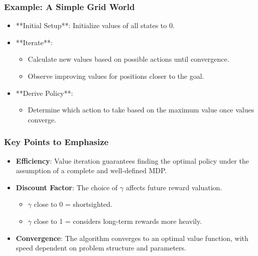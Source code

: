 \documentclass[aspectratio=169]{beamer}
\begin{document}
\begin{frame}[fragile]
    \frametitle{Example: A Simple Grid World}
    \begin{itemize}
        \item **Initial Setup**: Initialize values of all states to 0.
        
        \item **Iterate**: 
            \begin{itemize}
                \item Calculate new values based on possible actions until convergence. 
                \item Observe improving values for positions closer to the goal.
            \end{itemize}
        
        \item **Derive Policy**: 
            \begin{itemize}
                \item Determine which action to take based on the maximum value once values converge.
            \end{itemize}
    \end{itemize}
\end{frame}

\begin{frame}[fragile]
    \frametitle{Key Points to Emphasize}
    \begin{itemize}
        \item \textbf{Efficiency}: Value iteration guarantees finding the optimal policy under the assumption of a complete and well-defined MDP.
        
        \item \textbf{Discount Factor}: The choice of \( \gamma \) affects future reward valuation. 
            \begin{itemize}
                \item \( \gamma \) close to 0 = shortsighted.
                \item \( \gamma \) close to 1 = considers long-term rewards more heavily.
            \end{itemize}
        
        \item \textbf{Convergence}: The algorithm converges to an optimal value function, with speed dependent on problem structure and parameters.
    \end{itemize}
\end{frame}
\end{document}
